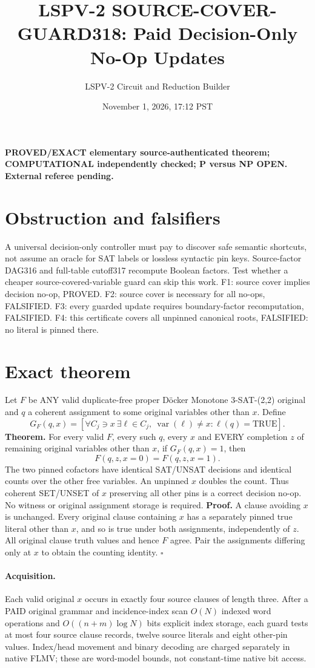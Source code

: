 \documentclass[11pt]{article}
\title{LSPV-2 SOURCE-COVER-GUARD318: Paid Decision-Only No-Op Updates}
\author{LSPV-2 Circuit and Reduction Builder}
\date{November 1, 2026, 17:12 PST}
\begin{document}
\maketitle
\noindent\textbf{PROVED/EXACT elementary source-authenticated theorem; COMPUTATIONAL independently checked; P versus NP OPEN. External referee pending.}
\section{Obstruction and falsifiers}
A universal decision-only controller must pay to discover safe semantic shortcuts, not assume an oracle for SAT labels or lossless syntactic pin keys. Source-factor DAG316 and full-table cutoff317 recompute Boolean factors. Test whether a cheaper source-covered-variable guard can skip this work. F1: source cover implies decision no-op, PROVED. F2: source cover is necessary for all no-ops, FALSIFIED. F3: every guarded update requires boundary-factor recomputation, FALSIFIED. F4: this certificate covers all unpinned canonical roots, FALSIFIED: no literal is pinned there.
\section{Exact theorem}
Let $F$ be ANY valid duplicate-free proper D\"ocker Monotone 3-SAT-(2,2) original and $q$ a coherent assignment to some original variables other than $x$. Define
\[
G_F(q,x)=[\forall C_j\ni x\ \exists \ell\in C_j,\ \operatorname{var}(\ell)\ne x:\ell(q)=\mathrm{TRUE}].
\]
\textbf{Theorem.} For every valid $F$, every such $q$, every $x$ and EVERY completion $z$ of remaining original variables other than $x$, if $G_F(q,x)=1$, then
\[
F(q,z,x=0)=F(q,z,x=1).
\]
The two pinned cofactors have identical SAT/UNSAT decisions and identical counts over the other free variables. An unpinned $x$ doubles the count. Thus coherent SET/UNSET of $x$ preserving all other pins is a correct decision no-op. No witness or original assignment storage is required.
\textbf{Proof.} A clause avoiding $x$ is unchanged. Every original clause containing $x$ has a separately pinned true literal other than $x$, and so is true under both assignments, independently of $z$. All original clause truth values and hence $F$ agree. Pair the assignments differing only at $x$ to obtain the counting identity. \hfill$\square$
\paragraph{Acquisition.} Each valid original $x$ occurs in exactly four source clauses of length three. After a PAID original grammar and incidence-index scan $O(N)$ indexed word operations and $O((n+m)\log N)$ bits explicit index storage, each guard tests at most four source clause records, twelve source literals and eight other-pin values. Index/head movement and binary decoding are charged separately in native FLMV; these are word-model bounds, not constant-time native bit access.
\end{document}
